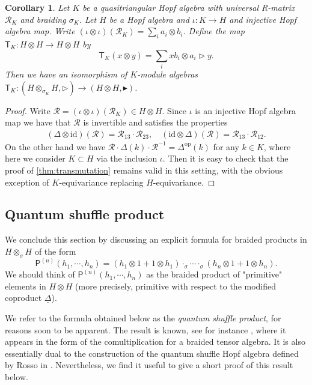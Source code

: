 \documentclass[a4paper, 12pt, reqno, english]{amsart}
\numberwithin{equation}{section}
\numberwithin{figure}{section}
\theoremstyle{plain}
\theoremstyle{plain}
\theoremstyle{plain}
\theoremstyle{plain}
\theoremstyle{plain}
\newtheorem{corollary}[theorem]{Corollary}
\theoremstyle{definition}
\theoremstyle{definition}
\theoremstyle{definition}
\theoremstyle{remark}
\theoremstyle{definition}
\theoremstyle{definition}
\newcommand{\id}{\mathrm{id}}
\newcommand{\op}{\mathrm{op}}
\newcommand{\calR}{\mathcal{R}}
\newcommand{\tmap}{\mathsf{T}}
\newcommand{\pmap}{\mathsf{P}}
\begin{document}
\begin{corollary}
\label{cor:relative-transmutation}
Let $K$ be a quasitriangular Hopf algebra with universal R-matrix $\calR_K$ and braiding $\sigma_K$.
Let $H$ be a Hopf algebra and $\iota: K \to H$ and injective Hopf algebra map.
Write $(\iota \otimes \iota) (\calR_K) = \sum_i a_i \otimes b_i$. Define the map $\tmap_K: H \otimes H \to H \otimes H$ by
\[
\tmap_K(x \otimes y) = \sum_i x b_i \otimes a_i \triangleright y.
\]
Then we have an isomorphism of $K$-module algebras $\tmap_K: (H \otimes_{\sigma_K} H, \triangleright) \to (H \otimes H, \blacktriangleright)$.
\end{corollary}

\begin{proof}
Write $\calR = (\iota \otimes \iota) (\calR_K) \in H \otimes H$. Since $\iota$ is an injective Hopf algebra map we have that $\calR$ is invertible and satisfies the properties
\[
\begin{gathered}
(\Delta \otimes \id) (\calR) = \calR_{1 3} \cdot \calR_{2 3}, \quad
(\id \otimes \Delta) (\calR) = \calR_{1 3} \cdot \calR_{1 2}.
\end{gathered}
\]
On the other hand we have $\calR \cdot \Delta(k) \cdot \calR^{-1} = \Delta^\op(k)$ for any $k \in K$, where here we consider $K \subset H$ via the inclusion $\iota$.
Then it is easy to check that the proof of \cref{thm:transmutation} remains valid in this setting, with the obvious exception of $K$-equivariance replacing $H$-equivariance.
\end{proof}

\subsection{Quantum shuffle product}

We conclude this section by discussing an explicit formula for braided products in $H \otimes_\sigma H$ of the form
\[
\pmap^{(n)} (h_1, \cdots, h_n) = (h_1 \otimes 1 + 1 \otimes h_1) \cdot_\sigma \cdots \cdot_\sigma (h_n \otimes 1 + 1 \otimes h_n).
\]
We should think of $\pmap^{(n)} (h_1, \cdots, h_n)$ as the braided product of "primitive" elements in $H \otimes H$ (more precisely, primitive with respect to the modified coproduct $\underline{\Delta}$).

We refer to the formula obtained below as the \emph{quantum shuffle product}, for reasons soon to be apparent.
The result is known, see for instance \cite[Theorem 6.4.9]{hs-book}, where it appears in the form of the comultiplication for a braided tensor algebra.
It is also essentially dual to the construction of the quantum shuffle Hopf algebra defined by Rosso in \cite{rosso}.
Nevertheless, we find it useful to give a short proof of this result below.
\end{document}
